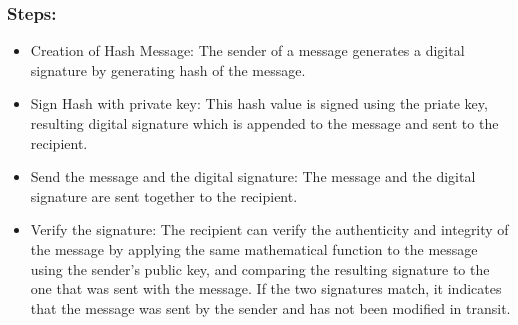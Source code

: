 \subsubsection{Steps:}
\begin{itemize}
	\item Creation of Hash Message: The sender of a message generates a digital signature by generating hash of the message.
	\item Sign Hash with private key: This hash value is signed using the priate key, resulting digital signature which is appended to the message and sent to the 
	recipient.
	\item Send the message and the digital signature: The message and the digital signature are sent together to the recipient.
	\item Verify the signature: The recipient can verify the authenticity and integrity of the message by applying the same 
	mathematical function to the message using the sender's public key, and comparing the resulting signature to the one that was sent with the message.
	If the two signatures match, it indicates that the message was sent by the sender and has not been modified in transit.
\end{itemize}
